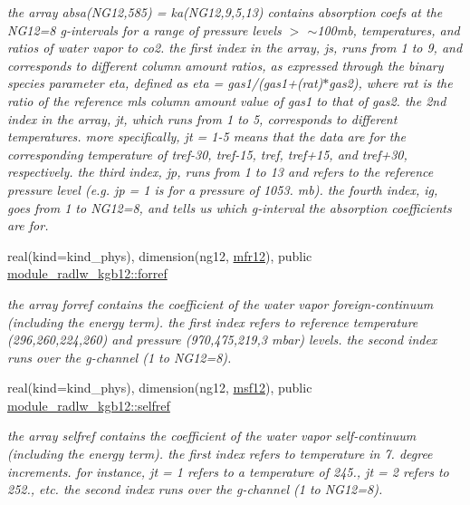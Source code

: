 \begin{DoxyCompactItemize}
\begin{DoxyCompactList}\small\item\em the array absa(\+N\+G12,585) = ka(\+N\+G12,9,5,13) contains absorption coefs at the N\+G12=8 g-\/intervals for a range of pressure levels $>$ $\sim$100mb, temperatures, and ratios of water vapor to co2. the first index in the array, js, runs from 1 to 9, and corresponds to different column amount ratios, as expressed through the binary species parameter eta, defined as eta = gas1/(gas1+(rat)$\ast$gas2), where rat is the ratio of the reference mls column amount value of gas1 to that of gas2. the 2nd index in the array, jt, which runs from 1 to 5, corresponds to different temperatures. more specifically, jt = 1-\/5 means that the data are for the corresponding temperature of tref-\/30, tref-\/15, tref, tref+15, and tref+30, respectively. the third index, jp, runs from 1 to 13 and refers to the reference pressure level (e.\+g. jp = 1 is for a pressure of 1053. mb). the fourth index, ig, goes from 1 to N\+G12=8, and tells us which g-\/interval the absorption coefficients are for. \end{DoxyCompactList}\item 
\mbox{\label{group__module__radlw__kgbnn_ga97dac0d0e010441171e09e317e5aeee8}} 
real(kind=kind\+\_\+phys), dimension(ng12, \hyperlink{group__module__radlw__kgbnn_gacd751a2e48d0286e3d25a9b658a8367a}{mfr12}), public \hyperlink{group__module__radlw__kgbnn_ga97dac0d0e010441171e09e317e5aeee8}{module\+\_\+radlw\+\_\+kgb12\+::forref}
\begin{DoxyCompactList}\small\item\em the array forref contains the coefficient of the water vapor foreign-\/continuum (including the energy term). the first index refers to reference temperature (296,260,224,260) and pressure (970,475,219,3 mbar) levels. the second index runs over the g-\/channel (1 to N\+G12=8). \end{DoxyCompactList}\item 
\mbox{\label{group__module__radlw__kgbnn_ga8aaf83ec7a08a244fd1e5396c9fd9b1d}} 
real(kind=kind\+\_\+phys), dimension(ng12, \hyperlink{group__module__radlw__kgbnn_ga3282a15ee0faaafd65509536a59e5b4f}{msf12}), public \hyperlink{group__module__radlw__kgbnn_ga8aaf83ec7a08a244fd1e5396c9fd9b1d}{module\+\_\+radlw\+\_\+kgb12\+::selfref}
\begin{DoxyCompactList}\small\item\em the array selfref contains the coefficient of the water vapor self-\/continuum (including the energy term). the first index refers to temperature in 7. degree increments. for instance, jt = 1 refers to a temperature of 245., jt = 2 refers to 252., etc. the second index runs over the g-\/channel (1 to N\+G12=8). \end{DoxyCompactList}\item 

\end{DoxyCompactItemize}
